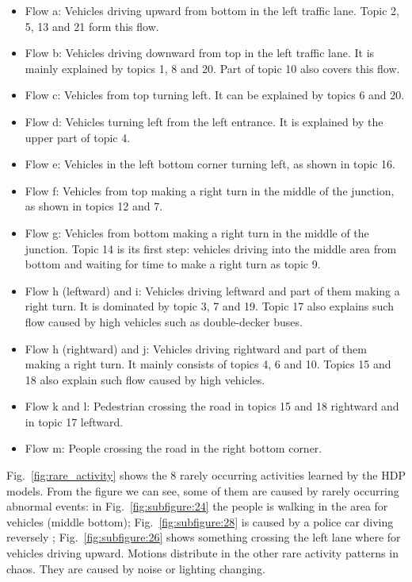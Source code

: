 \begin{itemize}
	\item Flow a: Vehicles driving upward from bottom in the left traffic lane. Topic 2, 5, 13 and 21 form this flow.
	\item Flow b: Vehicles driving downward from top in the left traffic lane. It is mainly explained by topics 1, 8 and 20. Part of topic 10 also covers this flow.
	\item Flow c: Vehicles from top turning left. It can be explained by topics 6 and 20.
	\item Flow d: Vehicles turning left from the left entrance. It is explained by the upper part of topic 4.
	\item Flow e: Vehicles in the left bottom corner turning left, as shown in topic 16.
	\item Flow f: Vehicles from top making a right turn in the middle of the junction, as shown in topics 12 and 7.
	\item Flow g: Vehicles from bottom making a right turn in the middle of the junction. Topic 14 is its first step: vehicles driving into the middle area from bottom and waiting for time to make a right turn as topic 9.
	\item Flow h (leftward) and i: Vehicles driving leftward and part of them making a right turn. It is dominated by topic 3, 7 and 19. Topic 17 also explains such flow caused by high vehicles such as double-decker buses.
	\item Flow h (rightward) and j: Vehicles driving rightward and part of them making a right turn. It mainly consists of topics 4, 6 and 10. Topics 15 and 18 also explain such flow caused by high vehicles.
	\item Flow k and l: Pedestrian crossing the road in topics 15 and 18 rightward and in topic 17 leftward.
	\item Flow m: People crossing the road in the right bottom corner. %
\end{itemize}



Fig.~\ref{fig:rare_activity} shows the 8 rarely occurring activities learned by the HDP models. From the figure we can see, some of them are caused by rarely occurring abnormal events: in Fig.~\ref{fig:subfigure:24} the people is walking in the area for vehicles (middle bottom); Fig.~\ref{fig:subfigure:28} is caused by a police car diving reversely ; Fig.~\ref{fig:subfigure:26} shows something crossing the left lane where for vehicles driving upward. Motions distribute in the other rare activity patterns in chaos. They are caused by noise or lighting changing.

